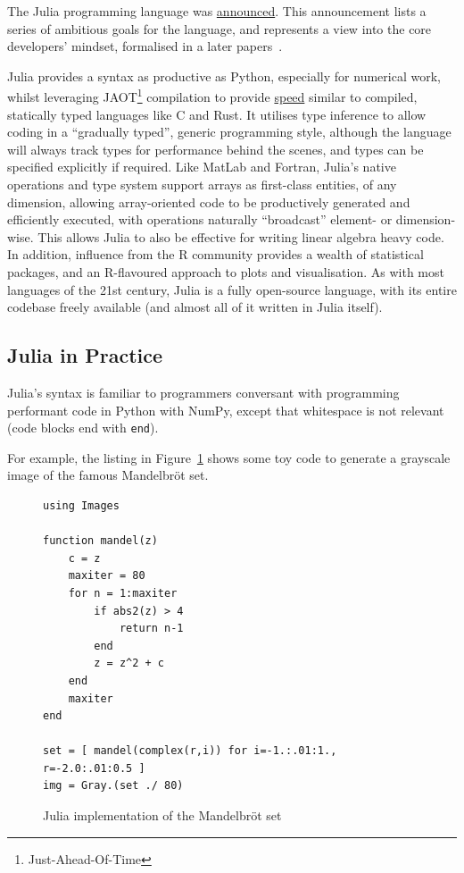\documentclass{webofc}
\begin{document}
The Julia programming language was
\href{https://julialang.org/blog/2012/02/why-we-created-julia/}{announced}. This
announcement lists a series of ambitious goals for the language, and represents
a view into the core developers' mindset, formalised in a later
papers~\cite{bib:julia_freshapproach,10.1145/3276490}.

Julia provides a syntax as productive as Python, especially for numerical work,
whilst leveraging JAOT\footnote{Just-Ahead-Of-Time} compilation to provide
\href{https://julialang.org/benchmarks/}{speed} similar to compiled, statically
typed languages like C and Rust. It utilises type inference to allow coding in a
``gradually typed'', generic programming style, although the language will
always track types for performance behind the scenes, and types can be specified
explicitly if required. Like MatLab and Fortran, Julia's native operations and
type system support arrays as first-class entities, of any dimension, allowing
array-oriented code to be productively generated and efficiently executed, with
operations naturally ``broadcast'' element- or dimension-wise. This allows Julia
to also be effective for writing linear algebra heavy code. In addition,
influence from the R community provides a wealth of statistical packages, and an
R-flavoured approach to plots and visualisation. As with most languages of the
21st century, Julia is a fully open-source language, with its entire codebase
freely available (and almost all of it written in Julia itself).

\subsection{Julia in Practice}
\label{sec:juliainpractice}

Julia's syntax is familiar to programmers conversant with programming performant
code in Python with NumPy, except that whitespace is not relevant
(code blocks end with \texttt{end}).

For example, the listing in Figure~\ref{code:madelbrot} shows some toy code to
generate a grayscale image of the famous Mandelbröt set.

\begin{figure}[!ht]
\centering
\begin{verbatim}
using Images

function mandel(z)
    c = z
    maxiter = 80
    for n = 1:maxiter
        if abs2(z) > 4
            return n-1
        end
        z = z^2 + c
    end
    maxiter
end

set = [ mandel(complex(r,i)) for i=-1.:.01:1., r=-2.0:.01:0.5 ]
img = Gray.(set ./ 80)
\end{verbatim}
\caption{Julia implementation of the Mandelbr\"{o}t set}
\label{code:madelbrot}
\end{figure}
\end{document}
